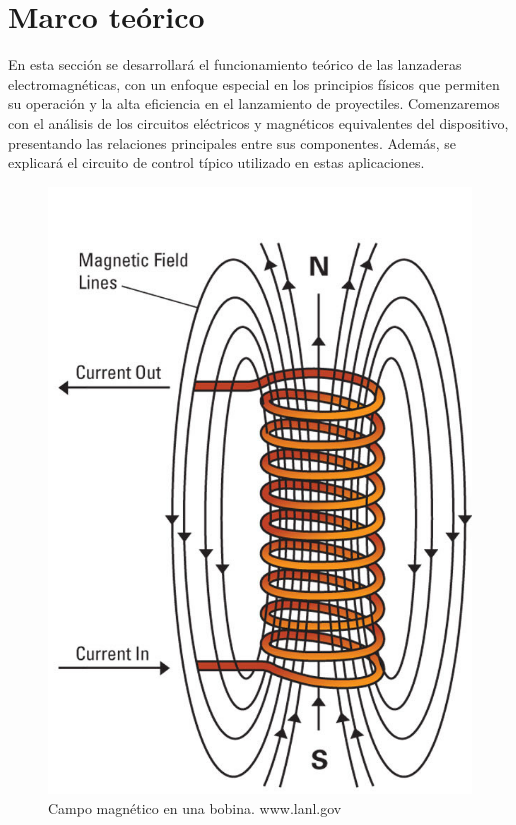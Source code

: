 \section{Marco teórico}

En esta sección se desarrollará el funcionamiento teórico de las lanzaderas electromagnéticas, con un enfoque especial en los principios físicos que permiten su operación y la alta eficiencia en el lanzamiento de proyectiles. Comenzaremos con el análisis de los circuitos eléctricos y magnéticos equivalentes del dispositivo, presentando las relaciones principales entre sus componentes. Además, se explicará el circuito de control típico utilizado en estas aplicaciones.

\begin{figure}[h]
    \includegraphics[width=\linewidth]{FigurasMemoria/fig3electromagnet.jpg}
    \caption{Campo magnético en una bobina. www.lanl.gov}
    \label{fig:3} %
\end{figure}

